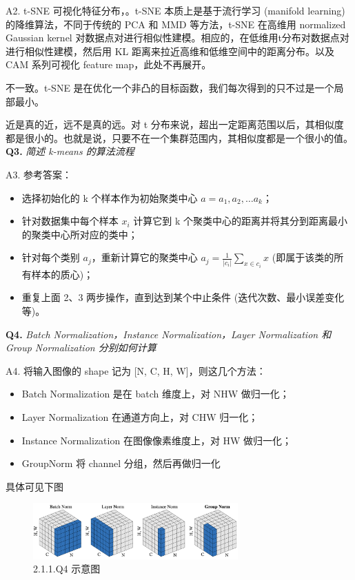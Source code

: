 \documentclass[cn,10pt,math=newtx,citestyle=gb7714-2015,bibstyle=gb7714-2015]{elegantbook}
\begin{document}
A2. t-SNE 可视化特征分布，。t-SNE 本质上是基于流行学习 (manifold learning) 的降维算法，不同于传统的 PCA 和 MMD 等方法，t-SNE 在高维用 normalized Gaussian kernel 对数据点对进行相似性建模。相应的，在低维用t分布对数据点对进行相似性建模，然后用 KL 距离来拉近高维和低维空间中的距离分布。以及CAM 系列可视化 feature map，此处不再展开。

不一致。t-SNE 是在优化一个非凸的目标函数，我们每次得到的只不过是一个局部最小。

近是真的近，远不是真的远。对 t 分布来说，超出一定距离范围以后，其相似度都是很小的。也就是说，只要不在一个集群范围内，其相似度都是一个很小的值。\\


\textbf{Q3.} \textit{简述 k-means 的算法流程}

A3. 参考答案：

\begin{itemize}
  \item 选择初始化的 k 个样本作为初始聚类中心 $a={a_1,a_2,…a_k}$；
  \item 针对数据集中每个样本 $x_i$ 计算它到 k 个聚类中心的距离并将其分到距离最小的聚类中心所对应的类中；
  \item 针对每个类别 $a_j$，重新计算它的聚类中心 $a_j=\frac{1}{\left| c_i \right|}\sum_{x\in c_i}x$ (即属于该类的所有样本的质心)；
  \item 重复上面 2、3 两步操作，直到达到某个中止条件 (迭代次数、最小误差变化等)。\\
\end{itemize}


\textbf{Q4.} \textit{Batch Normalization，Instance Normalization，Layer Normalization 和 Group Normalization 分别如何计算}

A4. 将输入图像的 shape 记为 [N, C, H, W]，则这几个方法：
\begin{itemize}
  \item Batch Normalization 是在 batch 维度上，对 NHW 做归一化；
  \item Layer Normalization 在通道方向上，对 CHW 归一化；
  \item Instance Normalization 在图像像素维度上，对 HW 做归一化；
  \item GroupNorm 将 channel 分组，然后再做归一化
\end{itemize}

具体可见下图

\begin{figure}[ht]
  \centering
  \includegraphics[width=0.7\textwidth]{image/2.1.1.q4.png}
  \caption{2.1.1.Q4 示意图}
\end{figure}
 
\end{document}
